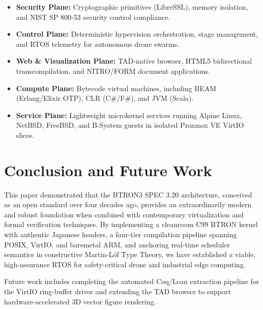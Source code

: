 \documentclass[10pt,journal,compsoc,twocolumn]{article}
\begin{document}
\begin{itemize}[leftmargin=*]
    \item \textbf{Security Plane:} Cryptographic primitives (LibreSSL), memory isolation, and NIST SP 800-53 security control compliance.
    \item \textbf{Control Plane:} Deterministic hypervision orchestration, stage management, and RTOS telemetry for autonomous drone swarms.
    \item \textbf{Web \& Visualization Plane:} TAD-native browser, HTML5 bidirectional transcompilation, and NITRO/FORM document applications.
    \item \textbf{Compute Plane:} Bytecode virtual machines, including BEAM (Erlang/Elixir OTP), CLR (C\#/F\#), and JVM (Scala).
    \item \textbf{Service Plane:} Lightweight microkernel services running Alpine Linux, NetBSD, FreeBSD, and B-System guests in isolated Proxmox VE VirtIO slices.
\end{itemize}

\section{Conclusion and Future Work}
\label{sec:conclusion}

This paper demonstrated that the BTRON3 SPEC 3.20 architecture, conceived as an open standard over four decades ago, provides an extraordinarily modern and robust foundation when combined with contemporary virtualization and formal verification techniques. By implementing a cleanroom C99 BTRON kernel with authentic Japanese headers, a four-tier compilation pipeline spanning POSIX, VirtIO, and baremetal ARM, and anchoring real-time scheduler semantics in constructive Martin-Löf Type Theory, we have established a viable, high-assurance RTOS for safety-critical drone and industrial edge computing.

Future work includes completing the automated Coq/Lean extraction pipeline for the VirtIO ring-buffer driver and extending the TAD browser to support hardware-accelerated 3D vector figure rendering.
\end{document}
